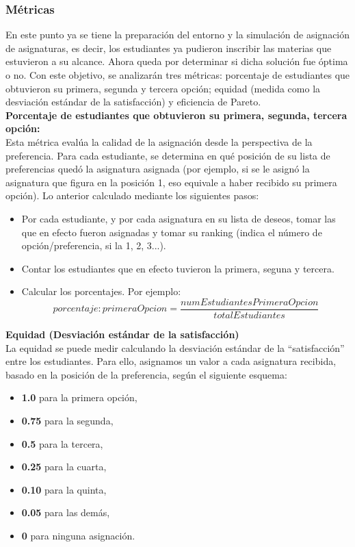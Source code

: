 \documentclass{article}
\begin{document}
\subsubsection{Métricas}

En este punto ya se tiene la preparación del entorno y la simulación de asignación de asignaturas, 
es decir, los estudiantes ya pudieron inscribir las materias que estuvieron a su alcance. Ahora 
queda por determinar si dicha solución fue óptima o no. Con este objetivo, se analizarán tres 
métricas: porcentaje de estudiantes que obtuvieron su primera, segunda y tercera opción; equidad 
(medida como la desviación estándar de la satisfacción) y 
eficiencia de Pareto.\\

\textbf{Porcentaje de estudiantes que obtuvieron su primera, segunda, tercera opción:}\\

Esta métrica evalúa la calidad de la asignación desde la perspectiva de la preferencia. 
Para cada estudiante, se determina en qué posición de su lista de preferencias quedó la 
asignatura asignada (por ejemplo, si se le asignó la asignatura que figura en la posición 1, 
eso equivale a haber recibido su primera opción). Lo anterior calculado mediante los siguientes pasos:

\begin{itemize}
  \item Por cada estudiante, y por cada asignatura en su lista de deseos, tomar las que en efecto 
        fueron asignadas y tomar su ranking (indica el número de opción/preferencia, si la 1, 2, 3...).
  \item Contar los estudiantes que en efecto tuvieron la primera, seguna y tercera.
  \item Calcular los porcentajes. Por ejemplo:
        $$
        porcentaje:primeraOpcion = \frac{numEstudiantesPrimeraOpcion}{totalEstudiantes}
        $$
\end{itemize}

\textbf{Equidad (Desviación estándar de la satisfacción)}\\

La equidad se puede medir calculando la desviación estándar de la ``satisfacción'' entre los 
estudiantes. Para ello, asignamos un valor a cada asignatura recibida, basado en la posición de 
la preferencia, según el siguiente esquema:

\begin{itemize}
    \item \textbf{1.0} para la primera opción,
    \item \textbf{0.75} para la segunda,
    \item \textbf{0.5} para la tercera,
    \item \textbf{0.25} para la cuarta,
    \item \textbf{0.10} para la quinta,
    \item \textbf{0.05} para las demás,
    \item \textbf{0} para ninguna asignación.
\end{itemize}
\end{document}
